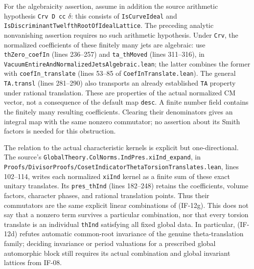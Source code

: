 For the algebraicity assertion, assume in addition the source
arithmetic hypothesis \texttt{Crv D cc} $\delta$: this consists of
\texttt{IsCurveIdeal} and
\texttt{IsDiscriminantTwelfthRootOfIdealLattice}. The preceding
analytic nonvanishing assertion requires no such arithmetic
hypothesis. Under \texttt{Crv}, the normalized coefficients of
these finitely many jets are algebraic: use
\texttt{thZero\_coefIn} (lines 236--257) and
\texttt{ta\_thMoved} (lines 311--316), in
\texttt{VacuumEntireAndNormalizedJetsAlgebraic.lean}; the latter
combines the former with \texttt{coefIn\_translate} (lines 53--85
of \texttt{CoefInTranslate.lean}). The general
\texttt{TA.transl} (lines 281--290) also transports an already
established \texttt{TA} property under rational translation.
These are properties of the actual normalized CM vector, not a
consequence of the default map \texttt{desc}. A finite number field
contains the finitely many resulting coefficients. Clearing their
denominators gives an integral map with the same nonzero commutator;
no assertion about its Smith factors is needed for this obstruction.

The relation to the actual characteristic kernels is explicit but
one-directional. The source's
\texttt{GlobalTheory.ColNorms.IndPres.xiInd\_expand}, in
\texttt{Proofs/DivisorProofs/CosetIndicatorThetaTorsionTranslates.lean},
lines 102--114, writes each normalized \texttt{xiInd} kernel as a
finite sum of these exact unitary translates. Its
\texttt{pres\_thInd} (lines 182--248) retains the coefficients,
volume factors, character phases, and rational translation points.
Thus their commutators are the same explicit linear combinations of
(IF-12g). This does not say that a nonzero term survives a particular
combination, nor that every torsion translate is an individual
\texttt{thInd} satisfying all fixed global data. In particular,
(IF-12d) refutes automatic common-root invariance of the genuine
theta-translation family; deciding invariance or period valuations
for a prescribed global automorphic block still requires its actual
combination and global invariant lattices from IF-08.
